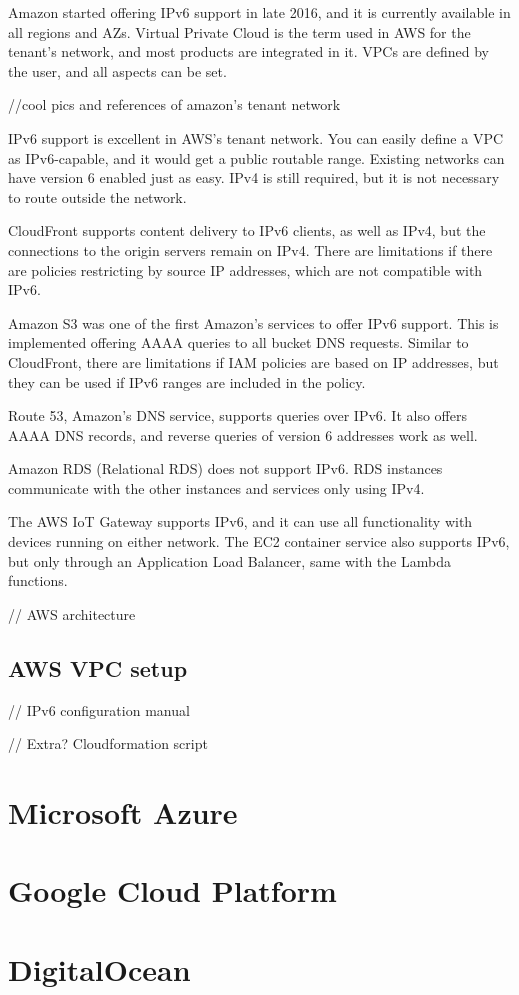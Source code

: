 Amazon started offering IPv6 support in late 2016, and it is currently available in all regions and AZs. Virtual Private Cloud is the term used in AWS for the tenant's network, and most products are integrated in it. VPCs are defined by the user, and all aspects can be set.

//cool pics and references of amazon's tenant network

IPv6 support is excellent in AWS's tenant network. You can easily define a VPC as IPv6-capable, and it would get a public routable range. Existing networks can have version 6 enabled just as easy. IPv4 is still required, but it is not necessary to route outside the network.



CloudFront supports content delivery to IPv6 clients, as well as IPv4, but the connections to the origin servers remain on IPv4. There are limitations if there are policies restricting by source IP addresses, which are not compatible with IPv6.

Amazon S3 was one of the first Amazon's services to offer IPv6 support. This is implemented offering AAAA queries to all bucket DNS requests. Similar to CloudFront, there are limitations if IAM policies are based on IP addresses, but they can be used if IPv6 ranges are included in the policy.

Route 53, Amazon's DNS service, supports queries over IPv6. It also offers AAAA DNS records, and reverse queries of version 6 addresses work as well.

Amazon RDS (Relational RDS) does not support IPv6. RDS instances communicate with the other instances and services only using IPv4.

The AWS IoT Gateway supports IPv6, and it can use all functionality with devices running on either network. The EC2 container service also supports IPv6, but only through an Application Load Balancer, same with the Lambda functions.  

// AWS architecture 
\subsection{AWS VPC setup}

// IPv6 configuration manual

// Extra? Cloudformation script

\section{Microsoft Azure}



\section{Google Cloud Platform}

\section{DigitalOcean}